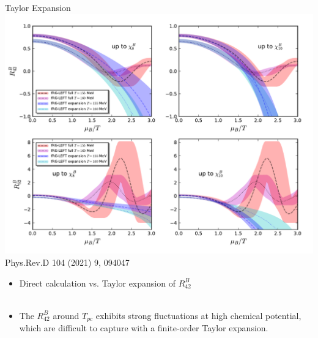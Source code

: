 \begin{frame}[fragile]
    Taylor Expansion
    \centering
    \vspace{-0.3cm}
    \includegraphics[width=0.9\linewidth,trim={0 9cm 0 0.5cm}, clip]{Images/Figures/R42R62expansion-muBoT.pdf}\\
    {\scriptsize Phys.Rev.D 104 (2021) 9, 094047}
    \begin{itemize}
    \item Direct calculation vs. Taylor expansion of $R^B_{42}$ \\~\
    \item The $R^B_{42}$ around $T_{pc}$ exhibits strong fluctuations at high chemical potential, which are difficult to capture with a finite-order Taylor expansion.
    \end{itemize}  
\end{frame}

